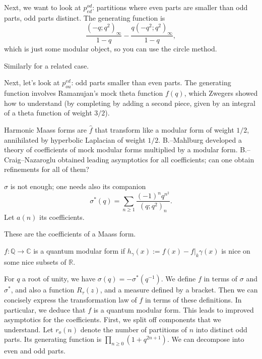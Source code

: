 \documentclass[reqno]{amsart} 
\begin{document}
Next, we want to look at $p_{e d}^{o d}$: partitions where even parts are smaller than odd parts, odd parts distinct.  The generating function is
\begin{equation*}
  \frac{(- q; q^2)_\infty}{ 1 - q}
  - \frac{q(- q^2 ; q^2)_\infty}{1 - q},
\end{equation*}
which is just some modular object, so you can use the circle method.

Similarly for a related case.

Next, let's look at $p_{o u}^{e d}$: odd parts smaller than even parts.  The generating function involves Ramanujan's mock theta function $f(q)$, which Zwegers showed how to understand (by completing by adding a second piece, given by an integral of a theta function of weight $3 /2$).

Harmonic Maass forms are $\hat{f}$ that transform like a modular form of weight $1/2$, annihilated by hyperbolic Laplacian of weight $1/2$.  B.--Mahlburg developed a theory of coefficients of mock modular forms multiplied by a modular form.  B.--Craig--Nazaroglu obtained leading asymptotics for all coefficients; can one obtain refinements for all of them?

$\sigma$ is not enough; one needs also its companion
\begin{equation*}
  \sigma^\ast(q) = \sum_{n \geq 1}
  \frac{(- 1)^n q^{n^2}}{(q; q^2)_n}.  
\end{equation*}
Let $a(n)$ its coefficients.
\begin{theorem}[Cohen]
  These are the coefficients of a Maass form.
\end{theorem}

\begin{definition}[Zagier]
  $f : \mathbb{Q} \rightarrow \mathbb{C}$ is a quantum modular form if $h_\gamma(x) := f(x) - f|_k \gamma(x)$ is nice on some nice subsets of $\mathbb{R}$.
\end{definition}

For $q$ a root of unity, we have $\sigma(q) = - \sigma^\ast(q^{-1})$.  We define $f$ in terms of $\sigma$ and $\sigma^\ast$, and also a function $R_\tau(z)$, and a measure defined by a bracket.  Then we can concisely express the transformation law of $f$ in terms of these definitions.  In particular, we deduce that $f$ is a quantum modular form.  This leads to improved asymptotics for the coefficients.  First, we split off components that we understand.  Let $r_o(n)$ denote the number of partitions of $n$ into distinct odd parts.  Its generating function is $\prod_{n \geq 0}(1 + q^{2 n + 1})$.  We can decompose into even and odd parts.
\end{document}
